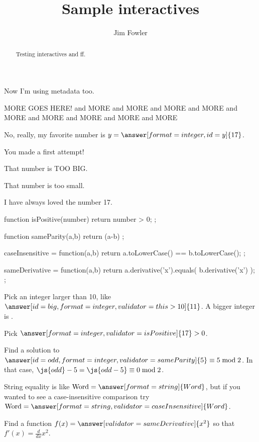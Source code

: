 \documentclass{ximera}
\title{Sample interactives}
\author{Jim Fowler}
\begin{document}
\begin{abstract}
Testing interactives and ff.
\end{abstract}
\maketitle

Now I'm using metadata too.

MORE GOES HERE!
and MORE
and MORE
and MORE
and MORE
and MORE
and MORE
and MORE
and MORE
and MORE

\begin{problem}
  No, really, my favorite number is $y = \answer[format=integer,id=y]{17}$.

  \begin{feedback}[attempt]
    You made a first attempt!
  \end{feedback}

  \begin{feedback}[y>17]
    That number is TOO BIG.
  \end{feedback}

  \begin{feedback}[y<17]
    That number is too small.
  \end{feedback}

  \begin{feedback}[correct]
    I have always loved the number 17.
  \end{feedback}
\end{problem}

\begin{javascript}
  function isPositive(number) {
    return number > 0;
  };

  function sameParity(a,b) {
    return (a-b)%
  };

  caseInsensitive = function(a,b) {
    return a.toLowerCase() == b.toLowerCase();
  };

  sameDerivative = function(a,b) {
    return a.derivative('x').equals( b.derivative('x') );
  };
\end{javascript}

\begin{problem}
  Pick an integer larger than 10, like $\answer[id=big,format=integer,validator=this>10]{11}$.  A bigger integer is .

  Pick $\answer[format=integer,validator=isPositive]{17} > 0$.

  Find a solution to $\answer[id=odd,format=integer,validator=sameParity]{5} \equiv 5 \bmod 2$.  In that case, $\js{odd} - 5 = \js{odd-5} \equiv 0 \bmod 2$.

  String equality is like $\mbox{Word} = \answer[format=string]{Word}$, but if you wanted to see a case-insensitive comparison try $\mbox{Word} = \answer[format=string,validator=caseInsensitive]{Word}$.

  Find a function $f(x) = \answer[validator=sameDerivative]{x^2}$ so that $f'(x) = \frac{d}{dx} x^2$.
\end{problem}
\end{document}
